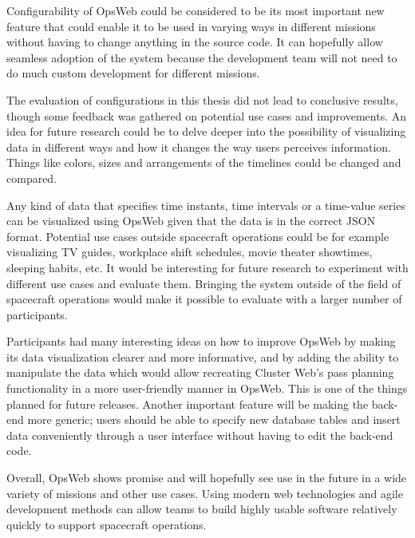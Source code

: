 Configurability of OpsWeb could be considered to be its most important new feature that could enable it to be used in varying ways in different missions without having to change anything in the source code. It can hopefully allow seamless adoption of the system because the development team will not need to do much custom development for different missions. 

The evaluation of configurations in this thesis did not lead to conclusive results, though some feedback was gathered on potential use cases and improvements. An idea for future research could be to delve deeper into the possibility of visualizing data in different ways and how it changes the way users perceives information. Things like colors, sizes and arrangements of the timelines could be changed and compared.

Any kind of data that specifies time instants, time intervals or a time-value series can be visualized using OpsWeb given that the data is in the correct JSON format. Potential use cases outside spacecraft operations could be for example visualizing TV guides, workplace shift schedules, movie theater showtimes, sleeping habits, etc. It would be interesting for future research to experiment with different use cases and evaluate them. Bringing the system outside of the field of spacecraft operations would make it possible to evaluate with a larger number of participants.

Participants had many interesting ideas on how to improve OpsWeb by making its data visualization clearer and more informative, and by adding the ability to manipulate the data which would allow recreating Cluster Web's pass planning functionality in a more user-friendly manner in OpsWeb. This is one of the things planned for future releases. Another important feature will be making the back-end more generic; users should be able to specify new database tables and insert data conveniently through a user interface without having to edit the back-end code.

Overall, OpsWeb shows promise and will hopefully see use in the future in a wide variety of missions and other use cases. Using modern web technologies and agile development methods can allow teams to build highly usable software relatively quickly to support spacecraft operations.